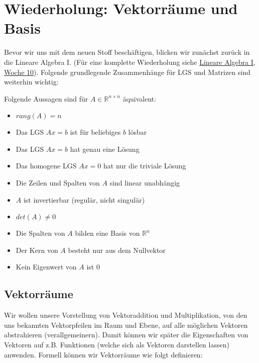 \setcounter{section}{-1}
\section{Wiederholung: Vektorräume und Basis}

Bevor wir uns mit dem neuen Stoff beschäftigen, blicken wir zunächst zurück in die Lineare Algebra I. (Für eine komplette Wiederholung siehe \href{https://n.ethz.ch/~nbartzsch/notizen/notizen_lin_alg_I/Uebung_10_Repetition.pdf}{Lineare Algebra I, Woche 10}). Folgende grundlegende Zusammenhänge für LGS und Matrizen sind weiterhin wichtig:

\begin{tcolorbox}[colback=gray!30, colframe=gray!80, title=Wichtige Zusammenhänge]
    Folgende Aussagen sind für \( A \in \mathbb{R}^{n \times n} \) äquivalent:
    \begin{itemize}
        \item \(rang (A) = n \)
        \item Das LGS \( Ax=b \) ist für beliebiges \( b \) lösbar
        \item Das LGS \( Ax=b \) hat genau eine Lösung
        \item Das homogene LGS \( Ax=0 \) hat nur die triviale Lösung
        \item Die Zeilen und Spalten von \( A \) sind linear unabhängig
        \item \( A \) ist invertierbar (regulär, nicht singulär)
        \item \( det(A) \neq 0 \)
        \item Die Spalten von \( A \) bilden eine Basis von \( \mathbb{R}^n \)
        \item Der Kern von \( A \) besteht nur aus dem Nullvektor
        \item Kein Eigenwert von \( A \) ist 0        
    \end{itemize}
\end{tcolorbox}

\subsection{Vektorräume}

Wir wollen unsere Vorstellung von Vektoraddition und Multiplikation, von den uns bekannten Vektorpfeilen im Raum und Ebene, auf alle möglichen Vektoren abstrahieren (verallgemeinern). Damit können wir später die Eigenschaften von Vektoren auf z.B. Funktionen (welche sich als Vektoren darstellen lassen) anwenden. Formell können wir Vektorräume wie folgt definieren:

